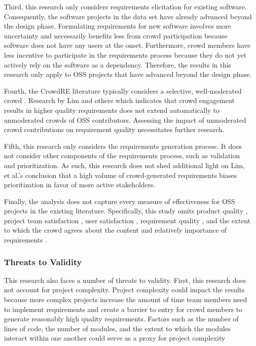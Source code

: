 Third, this research only considers requirements elicitation for existing software. Consequently, the software projects in the data set have already advanced beyond the design phase. Formulating requirements for new software involves more uncertainty and necessarily benefits less from crowd participation because software does not have any users at the onset. Furthermore, crowd members have less incentive to participate in the requirements process because they do not yet actively rely on the software as a dependency. Therefore, the results in this research only apply to OSS projects that have advanced beyond the design phase.

Fourth, the CrowdRE literature typically considers a selective, well-moderated crowd \cite{stakerare}. Research by Lim \cite{stakerare, stakesource, lim} and others which indicates that crowd engagement results in higher quality requirements does not extend automatically to unmoderated crowds of OSS contributors. Assessing the impact of unmoderated crowd contributions on requirement quality necessitates further research.

Fifth, this research only considers the requirements generation process. It does not consider other components of the requirements process, such as validation and prioritization. As such, this research does not shed additional light on Lim, et al.'s \cite{stakenet} conclusion that a high volume of crowd-generated requirements biases prioritization in favor of more active stakeholders.

Finally, the analysis does not capture every measure of effectiveness for OSS projects in the existing literature. Specifically, this study omits product quality \cite{stewart}, project team satisfaction \cite{ghapanchi}, user satisfaction \cite{ghapanchi}, requirement quality \cite{ma}, and the extent to which the crowd agrees about the content and relatively importance of requirements \cite{ma}. 

\subsubsection{Threats to Validity}

This research also faces a number of threats to validity. First, this research does not account for project complexity. Project complexity could impact the results because more complex projects increase the amount of time team members need to implement requirements and create a barrier to entry for crowd members to generate reasonably high quality requirements. Factors such as the number of lines of code, the number of modules, and the extent to which the modules interact within one another could serve as a proxy for project complexity

